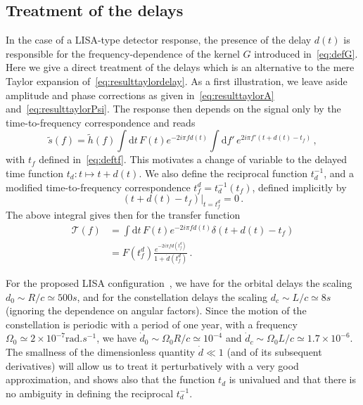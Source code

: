 \documentclass[aps,showpacs,twocolumn,
prd,superscriptaddress,nofootinbib]{revtex4-1}
\newcommand{\be}{\begin{equation}}
\newcommand{\ee}{\end{equation}}
\newcommand\ud{{\mathrm{d}}}
\newcommand\calT{{\mathcal{T}}}
\newcommand{\nn}{\nonumber}
\newcommand{\tf}{t_{f}}
\newcommand{\tfd}{t_{f}^{d}}
\begin{document}

\subsection{Treatment of the delays}
\label{subsec:delays}

In the case of a LISA-type detector response, the presence of the delay $d(t)$ is responsible for the frequency-dependence of the kernel $G$ introduced in~\eqref{eq:defG}. Here we give a direct treatment of the delays which is an alternative to the mere Taylor expansion of~\eqref{eq:resulttaylordelay}. As a first illustration, we leave aside amplitude and phase corrections as given in~\eqref{eq:resulttaylorA} and~\eqref{eq:resulttaylorPsi}. The response then depends on the signal only by the time-to-frequency correspondence and reads
\begin{equation}
	\tilde{s}(f) = \tilde{h}(f) \int \ud t \, F(t) e^{-2i\pi f d(t)} \int \ud f' \, e^{2i\pi f' (t+d(t) - t_{f})} \,,
\end{equation}
with $\tf$ defined in~\eqref{eq:deftf}. This motivates a change of variable to the delayed time function $t_{d}:t \mapsto t+d(t)$. We also define the reciprocal function $t_{d}^{-1}$, and a modified time-to-frequency correspondence $\tfd = t_{d}^{-1}(\tf)$, defined implicitly by
\be
	\left. (t + d(t) - t_{f})\right|_{t=t_{f}^{d}} = 0 \,.
\ee
The above integral gives then for the transfer function
\begin{align}\label{eq:delaycorrleading}
	\calT(f) &= \int \ud t \, F(t) e^{-2i\pi f d(t)} \delta(t + d(t) - t_{f}) \nn \\
	&= F(t_{f}^{d}) \frac{e^{-2i\pi f d(t_{f}^{d})}}{1+\dot{d}(t_{f}^{d})} \,.
\end{align}

For the proposed LISA configuration~\cite{LISA17}, we have for the orbital delays the scaling $d_{0}\sim R/c \simeq 500s$, and for the constellation delays the scaling $d_{c}\sim L/c \simeq 8s$ (ignoring the dependence on angular factors). Since the motion of the constellation is periodic with a period of one year, with a frequency $\Omega_{0} \simeq 2 \times 10^{-7}\mathrm{rad}.s^{-1}$, we have $\dot{d}_{0} \sim \Omega_{0} R/c \simeq 10^{-4}$ and $\dot{d}_{c} \sim \Omega_{0} L/c \simeq 1.7 \times 10^{-6}$. The smallness of the dimensionless quantity $\dot{d} \ll 1$ (and of its subsequent derivatives) will allow us to treat it perturbatively with a very good approximation, and shows also that the function $t_{d}$ is univalued and that there is no ambiguity in defining the reciprocal $t_{d}^{-1}$.
\end{document}
